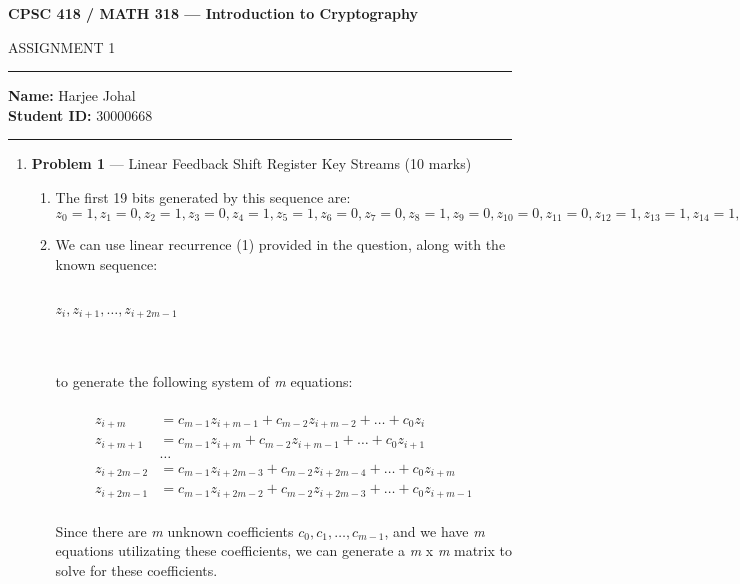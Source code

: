 \documentclass[11pt]{article}
\theoremstyle{definition}
\begin{document}
\begin{center}
{\bf \Large CPSC 418 / MATH 318 --- Introduction to Cryptography

ASSIGNMENT 1 }
\end{center}

\hrule 	

\textbf{Name:} Harjee Johal\\
\textbf{Student ID:} 30000668

\medskip \hrule

\begin{enumerate} \itemsep 20pt

\item[] \textbf{Problem 1} --- Linear Feedback Shift Register Key Streams (10 marks)

\begin{enumerate}

\item The first 19 bits generated by this sequence are: $z_0 = 1, z_1 = 0, z_2 = 1, z_3 = 0, z_4 = 1, z_5 = 1, z_6 = 0, z_7 = 0, z_8 = 1, z_9 = 0, z_{10} = 0, z_{11} = 0, z_{12} = 1, z_{13} = 1, z_{14} = 1, z_{15} = 1, z_{16} = 0, z_{17} = 1, z_{18} = 0$\\

\item We can use linear recurrence (1) provided in the question, along with the known sequence: \\ \\
\centerline{$z_{i}, z_{i+1}, \ldots , z_{i+2m-1}$}
\\ \\
to generate the following system of \textit{m} equations:\\ \\
\begin{align*}
z_{i+m} &= c_{m-1} z_{i+m-1} + c_{m-2} z_{i+m-2} + \ldots + c_0 z_i\\
z_{i+m+1} &= c_{m-1} z_{i+m} + c_{m-2} z_{i+m-1} + \ldots + c_0 z_{i+1}\\
&\ldots \\
z_{i+2m-2} &= c_{m-1} z_{i+2m-3} + c_{m-2} z_{i+2m-4} + \ldots + c_0 z_{i+m}\\
z_{i+2m-1} &= c_{m-1} z_{i+2m-2} + c_{m-2} z_{i+2m-3} + \ldots + c_0 z_{i+m-1}\\
\end{align*}

Since there are \textit{m} unknown coefficients $c_0, c_1, \ldots , c_{m-1}$, and we have \textit{m} equations utilizating these coefficients, we can generate a \textit{m} x \textit{m} matrix to solve for these coefficients.\\


\end{enumerate}
\end{enumerate}
\end{document}

